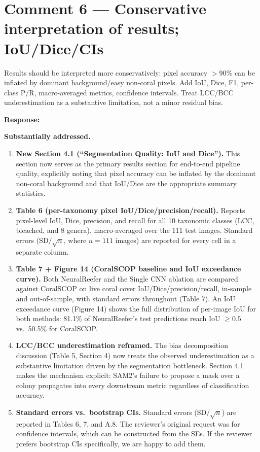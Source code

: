 \documentclass[12pt]{article}
\newenvironment{reviewercomment}{%
  \begin{mdframed}[backgroundcolor=gray!10,linecolor=gray!40,
                   leftmargin=0pt,rightmargin=0pt,
                   innerleftmargin=8pt,innerrightmargin=8pt,
                   innertopmargin=6pt,innerbottommargin=6pt]
  \itshape\color{quotegray}%
}{%
  \end{mdframed}%
}
\newenvironment{response}{%
  \vspace{4pt}%
  \color{respblue}%
  \noindent\textbf{Response:}\space
}{%
  \vspace{10pt}%
}
\begin{document}
\section*{Comment 6 --- Conservative interpretation of results; IoU/Dice/CIs}

\begin{reviewercomment}
Results should be interpreted more conservatively: pixel accuracy $>$90\% can
be inflated by dominant background/easy non-coral pixels.  Add IoU, Dice, F1,
per-class P/R, macro-averaged metrics, confidence intervals.  Treat
LCC/BCC underestimation as a substantive limitation, not a minor residual bias.
\end{reviewercomment}

\begin{response}
\textbf{Substantially addressed.}

\begin{enumerate}[topsep=2pt,itemsep=3pt]
  \item \textbf{New Section 4.1 (``Segmentation Quality: IoU and Dice'').}
    This section now serves as the primary results section for end-to-end
    pipeline quality, explicitly noting that pixel accuracy can be inflated by
    the dominant non-coral background and that IoU/Dice are the appropriate
    summary statistics.

  \item \textbf{Table 6 (per-taxonomy pixel IoU/Dice/precision/recall).}
    Reports pixel-level IoU, Dice, precision, and recall for all 10 taxonomic
    classes (LCC, bleached, and 8 genera), macro-averaged over the 111 test
    images.  Standard errors ($\mathrm{SD}/\!\sqrt{n}$, where $n = 111$
    images) are reported for every cell in a separate column.

  \item \textbf{Table 7 + Figure 14 (CoralSCOP baseline and IoU exceedance
    curve).}  Both NeuralReefer and the Single CNN ablation are compared against
    CoralSCOP on live coral cover IoU/Dice/precision/recall, in-sample and
    out-of-sample, with standard errors throughout (Table 7).  An IoU
    exceedance curve (Figure 14) shows the full distribution of per-image IoU
    for both methods: 81.1\% of NeuralReefer's test predictions reach
    IoU $\geq 0.5$ vs.\ 50.5\% for CoralSCOP.

  \item \textbf{LCC/BCC underestimation reframed.}  The bias decomposition
    discussion (Table 5, Section 4) now treats the observed underestimation as
    a substantive limitation driven by the segmentation bottleneck.  Section 4.1 makes the mechanism explicit: SAM2's failure
    to propose a mask over a colony propagates into every downstream metric
    regardless of classification accuracy.

  \item \textbf{Standard errors vs.\ bootstrap CIs.}  Standard errors
    ($\mathrm{SD}/\!\sqrt{n}$) are reported in Tables 6, 7, and A.8.  The
    reviewer's original request was for confidence intervals, which can be constructed from the SEs.  If the reviewer prefers
    bootstrap CIs specifically, we are happy to add them.
\end{enumerate}
\end{response}
\end{document}
